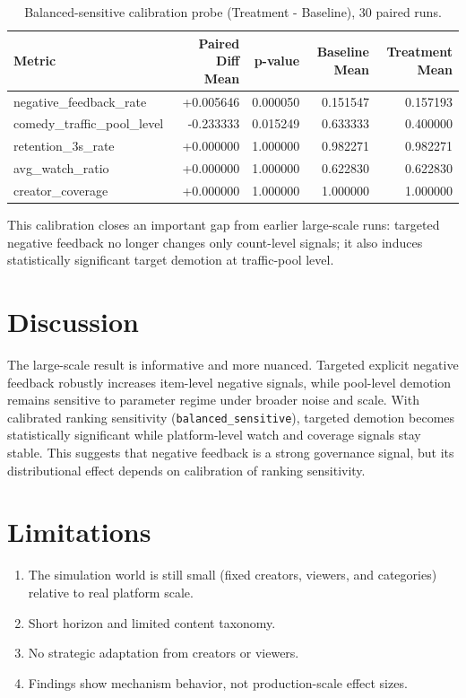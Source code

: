 \documentclass[11pt]{article}
\begin{document}
\begin{table}[h]
\centering
\begin{tabular}{lrrrr}
\toprule
Metric & Paired Diff Mean & p-value & Baseline Mean & Treatment Mean \\
\midrule
negative\_feedback\_rate & +0.005646 & 0.000050 & 0.151547 & 0.157193 \\
comedy\_traffic\_pool\_level & -0.233333 & 0.015249 & 0.633333 & 0.400000 \\
retention\_3s\_rate & +0.000000 & 1.000000 & 0.982271 & 0.982271 \\
avg\_watch\_ratio & +0.000000 & 1.000000 & 0.622830 & 0.622830 \\
creator\_coverage & +0.000000 & 1.000000 & 1.000000 & 1.000000 \\
\bottomrule
\end{tabular}
\caption{Balanced-sensitive calibration probe (Treatment - Baseline), 30 paired runs.}
\label{tab:balanced-calibration}
\end{table}

This calibration closes an important gap from earlier large-scale runs:
targeted negative feedback no longer changes only count-level signals; it also
induces statistically significant target demotion at traffic-pool level.

\section{Discussion}
The large-scale result is informative and more nuanced. Targeted explicit
negative feedback robustly increases item-level negative signals, while
pool-level demotion remains sensitive to parameter regime under broader noise
and scale. With calibrated ranking sensitivity (\texttt{balanced\_sensitive}),
targeted demotion becomes statistically significant while platform-level watch
and coverage signals stay stable. This suggests that negative feedback is a
strong governance signal, but its distributional effect depends on calibration
of ranking sensitivity.

\section{Limitations}
\begin{enumerate}
\item The simulation world is still small (fixed creators, viewers, and categories) relative to real platform scale.
\item Short horizon and limited content taxonomy.
\item No strategic adaptation from creators or viewers.
\item Findings show mechanism behavior, not production-scale effect sizes.
\end{enumerate}
\end{document}
